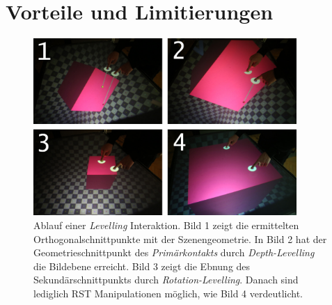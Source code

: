 \section{Vorteile und Limitierungen}
\label{sec:vorteile_und_limitierungen_implizit}

\begin{figure}
	\begin{center}
		\includegraphics[width=10cm]{img/levelling_lock.pdf}
	\end{center}
	\caption{Ablauf einer \emph{Levelling} Interaktion. Bild 1 zeigt die ermittelten Orthogonalschnittpunkte mit der Szenengeometrie. In Bild 2 hat der Geometrieschnittpunkt des \emph{Primärkontakts} durch \emph{Depth-Levelling} die Bildebene erreicht. Bild 3 zeigt die Ebnung des Sekundärschnittpunkts durch \emph{Rotation-Levelling}. Danach sind lediglich RST Manipulationen möglich, wie Bild 4 verdeutlicht.}
	\label{fig:levelling_lock}
\end{figure}

